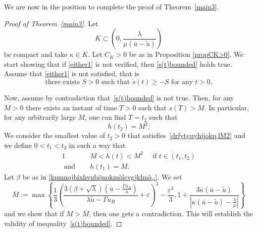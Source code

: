 \documentclass[12pt,a4paper,intlimits,sumlimits]{amsart}
\theoremstyle{definition}
\theoremstyle{plain}
\numberwithin{equation}{section}
\renewcommand{\ge}{\geqslant}
\begin{document}
We are now in the position to complete the proof of Theorem~\ref{main3}.

\begin{proof}[Proof of Theorem~\ref{main3}]
 Let 
\begin{equation}\label{kxjiquhftypijhugyftdrseawsdrtfygfcdxsexdrcftg}
K\subset \left(0, \dfrac{\lambda}{\mu(\overline u-\widetilde u)}\right)
\end{equation}
be compact and take $\kappa\in K$. Let $C_K>0$ be as in Proposition \ref{propCK>0}.
We start showing that if \eqref{either1} is not verified, then \eqref{s(t)bounded} holds true. Assume that \eqref{either1} is not satisfied, that is
\begin{equation}\label{okpuyftcdvklmòà.-}
\mbox{there exists $S>0$ such that $\dot{s}(t)\ge - S$ for any $t>0$}.
\end{equation}

Now, assume by contradiction that~\eqref{s(t)bounded} is not true. Then, for any $M>0$ there exists an instant of time $T>0$ such that $s(T)>M$.  In particular, for any arbitrarily large $M$, one can find $T=t_2$ such that
\begin{equation}\label{drfytguyhijokp,lM2}
h(t_2)=M^2.
\end{equation}
We consider the smallest value of $t_2>0$ that satisfies~\eqref{drfytguyhijokp,lM2} and we define $0<t_1<t_2$ in such a way that
\begin{alignat}{1}\label{gBCFhòfiòOFJEHò1}
&M< h(t) < M^2\quad\mbox{ if } t\in (t_1, t_2)\\ \label{ctfvygbhunjmk}
\mbox{ and }\quad& h(t_1)=M.
\end{alignat}
Let $\beta$ be as in \eqref{kpmnojbixhvubijnokmòlcvgjklmò,.}. We set
\begin{equation}\label{overlineMdefn}
\overline M:=\max\left\{\frac13\left(\dfrac{3(\beta +\sqrt{\lambda})\left(\overline u-\frac{\Gamma u_B}{\lambda}\right)}{\lambda\widetilde u-\Gamma u_B} +\varepsilon\right)^3 -\frac{\varepsilon^3}{3}, 1+\dfrac{3\kappa(\overline{u} -\widetilde u)}{\left|\kappa(\overline{u}-\widetilde u)-\frac{\lambda}{\mu}\right|}\right\}
\end{equation}
and we show that if $M>\overline M$, then one gets a contradiction. This will establish the validity of inequality~\eqref{s(t)bounded}.


\end{proof}
\end{document}
